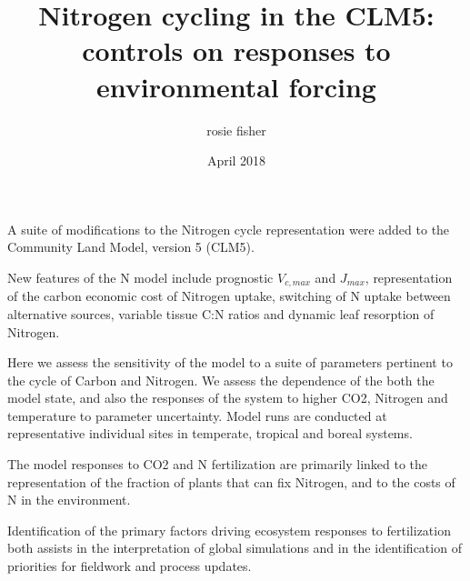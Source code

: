 \documentclass[draft,linenumbers]{agujournal}
\begin{document}

\title{Nitrogen cycling in the CLM5: controls on responses to environmental forcing}
\author{rosie fisher}
\date{April 2018}








\begin{keypoints}

\item A suite of modifications to the Nitrogen cycle representation were added to the Community Land Model, version 5 (CLM5).

\item New features of the N model include prognostic $V_{c,max}$ and $J_{max}$, representation of the carbon economic cost of Nitrogen uptake, switching of N uptake between alternative sources, variable tissue C:N ratios and dynamic leaf resorption of Nitrogen.

\item Here we assess the sensitivity of the model to a suite of parameters pertinent to the cycle of Carbon and Nitrogen. We assess the dependence of the both the model state, and also the responses of the system to higher CO2, Nitrogen and temperature to parameter uncertainty. Model runs are conducted at representative individual sites in temperate, tropical and boreal systems.

\item The model responses to CO2 and N fertilization are primarily linked to the representation of the fraction of plants that can fix Nitrogen, and to the costs of N in the environment.

\item Identification of the primary factors driving ecosystem responses to fertilization both assists in the interpretation of global simulations and in the identification of priorities for fieldwork and process updates.

\end{keypoints}
\end{document}
